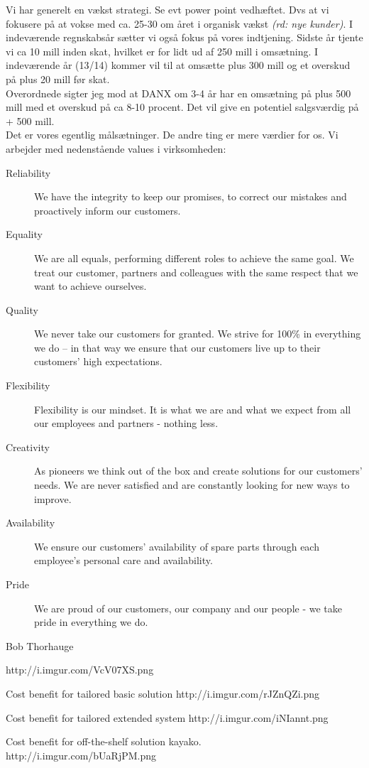 \begin{thebibliography}{9}
Vi har generelt en vækst strategi. Se evt power point vedhæftet. Dvs at vi fokusere på at vokse med ca. 25-30 om året i organisk vækst \emph{(rd: nye kunder)}. I indeværende regnskabsår sætter vi også fokus på vores indtjening. Sidste år tjente vi ca 10 mill inden skat, hvilket er for lidt ud af 250 mill i omsætning. I indeværende år (13/14) kommer vil til at omsætte plus 300 mill og et overskud på plus 20 mill før skat.\\
Overordnede sigter jeg mod at DANX om 3-4 år har en omsætning på plus 500 mill med et overskud på ca 8-10 procent. Det vil give en potentiel salgsværdig på + 500 mill.\\
Det er vores egentlig målsætninger. De andre ting er mere værdier for os. Vi arbejder med nedenstående values i virksomheden:
\begin{description}
\item[Reliability]
We have the integrity to keep our promises, to correct our mistakes and proactively inform our customers.
\item[Equality]
We are all equals, performing different roles to achieve the same goal.
We treat our customer, partners and colleagues with the same respect that we want to achieve ourselves.
\item[Quality]
We never take our customers for granted.
We strive for 100\% in everything we do – in that way we ensure that our customers live up to their customers’ high expectations.
\item[Flexibility]
Flexibility is our mindset. It is what we are and what we expect from all our employees and partners - nothing less.
\item[Creativity]
As pioneers we think out of the box and create solutions for our customers’ needs.
We are never satisfied and are constantly looking for new ways to improve.
\item[Availability]
We ensure our customers’ availability of spare parts through each employee’s personal care and availability.
\item[Pride]
We are proud of our customers, our company and our people - we take pride in everything we do.
\end{description}
Bob Thorhauge

	http://i.imgur.com/VcV07XS.png
	
Cost benefit for tailored basic solution
http://i.imgur.com/rJZnQZi.png

Cost benefit for tailored extended system
http://i.imgur.com/iNIannt.png

	Cost benefit for off-the-shelf solution kayako.\\
	http://i.imgur.com/bUaRjPM.png
	
\end{thebibliography}